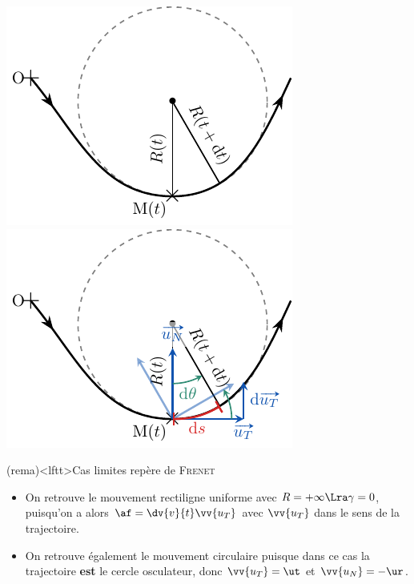 \documentclass[../../main/main.tex]{subfiles}
\begin{document}
\begin{tcb}
\begin{isd}[interior hidden, righthand ratio=.3]
\begin{center}
{				\includegraphics[width=\linewidth]{frenet_demo_stud}
			}{%
				\includegraphics[width=\linewidth]{frenet_demo_prof}
			}%
			\vspace{-15pt}
		\end{center}
	\end{isd}
\end{tcb}

\begin{tcb}(rema)<lftt>{Cas limites repère de \textsc{Frenet}}
	\begin{itemize}
		\item On retrouve le mouvement rectiligne uniforme avec $R = +\infty \Lra
			      \gamma = 0$, puisqu'on a alors $\af = \dv{v}{t}\vv{u_T}$ avec
		      $\vv{u_T}$ dans le sens de la trajectoire.

		\item On retrouve également le mouvement circulaire puisque dans ce cas la
		      trajectoire \textbf{est} le cercle osculateur, donc $\vv{u_T} = \ut$ et
		      $\vv{u_N} = -\ur$.
	\end{itemize}
	\vspace{-15pt}
\end{tcb}
\end{document}
